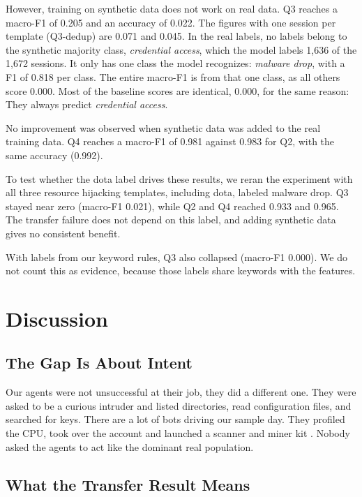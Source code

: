 \documentclass[runningheads]{llncs}
\begin{document}
However, training on synthetic data does not work on real data. Q3 reaches a macro-F1 of 0.205 and an accuracy of 0.022. The figures with one session per template (Q3-dedup) are 0.071 and 0.045. In the real labels, no labels belong to the synthetic majority class, \emph{credential access}, which the model labels 1,636 of the 1,672 sessions. It only has one class the model recognizes: \emph{malware drop}, with a F1 of 0.818 per class. The entire macro-F1 is from that one class, as all others score 0.000. Most of the baseline scores are identical, 0.000, for the same reason: They always predict \emph{credential access}.

No improvement was observed when synthetic data was added to the real training data. Q4 reaches a macro-F1 of 0.981 against 0.983 for Q2, with the same accuracy (0.992).

To test whether the dota label drives these results, we reran the experiment with all three resource hijacking templates, including dota, labeled malware drop. Q3 stayed near zero (macro-F1 0.021), while Q2 and Q4 reached 0.933 and 0.965. The transfer failure does not depend on this label, and adding synthetic data gives no consistent benefit.

With labels from our keyword rules, Q3 also collapsed (macro-F1 0.000). We do not count this as evidence, because those labels share keywords with the features.

\section{Discussion}

\subsection{The Gap Is About Intent}

Our agents were not unsuccessful at their job, they did a different one. They were asked to be a curious intruder and listed directories, read configuration files, and searched for keys. There are a lot of bots driving our sample day. They profiled the CPU, took over the account and launched a scanner and miner kit \cite{trendmicro2018outlaw}. Nobody asked the agents to act like the dominant real population.

\subsection{What the Transfer Result Means}
\end{document}
